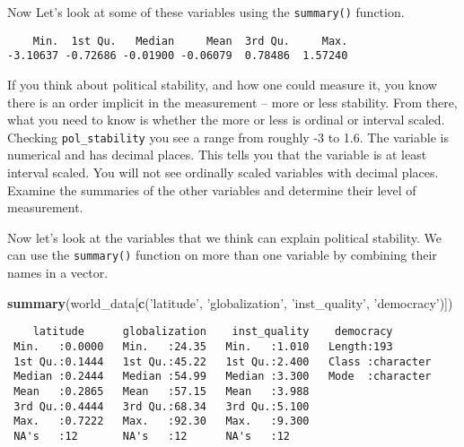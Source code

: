 \documentclass[]{article}
\newenvironment{Shaded}{\begin{snugshade}}{\end{snugshade}}
\newcommand{\KeywordTok}[1]{\textcolor[rgb]{0.13,0.29,0.53}{\textbf{#1}}}
\newcommand{\NormalTok}[1]{#1}
\newcommand{\OperatorTok}[1]{\textcolor[rgb]{0.81,0.36,0.00}{\textbf{#1}}}
\newcommand{\StringTok}[1]{\textcolor[rgb]{0.31,0.60,0.02}{#1}}
\begin{document}
Now Let's look at some of these variables using the \texttt{summary()} function.

\begin{Shaded}
\end{Shaded}

\begin{verbatim}
    Min.  1st Qu.   Median     Mean  3rd Qu.     Max. 
-3.10637 -0.72686 -0.01900 -0.06079  0.78486  1.57240 
\end{verbatim}

If you think about political stability, and how one could measure it, you know there is an order implicit in the measurement -- more or less stability. From there, what you need to know is whether the more or less is ordinal or interval scaled. Checking \texttt{pol\_stability} you see a range from roughly -3 to 1.6. The variable is numerical and has decimal places. This tells you that the variable is at least interval scaled. You will not see ordinally scaled variables with decimal places. Examine the summaries of the other variables and determine their level of measurement.

Now let's look at the variables that we think can explain political stability. We can use the \texttt{summary()} function on more than one variable by combining their names in a vector.

\begin{Shaded}
\begin{Highlighting}[]
\KeywordTok{summary}\NormalTok{(world_data[}\KeywordTok{c}\NormalTok{(}\StringTok{'latitude'}\NormalTok{, }\StringTok{'globalization'}\NormalTok{, }\StringTok{'inst_quality'}\NormalTok{, }\StringTok{'democracy'}\NormalTok{)])}
\end{Highlighting}
\end{Shaded}

\begin{verbatim}
    latitude      globalization    inst_quality    democracy        
 Min.   :0.0000   Min.   :24.35   Min.   :1.010   Length:193        
 1st Qu.:0.1444   1st Qu.:45.22   1st Qu.:2.400   Class :character  
 Median :0.2444   Median :54.99   Median :3.300   Mode  :character  
 Mean   :0.2865   Mean   :57.15   Mean   :3.988                     
 3rd Qu.:0.4444   3rd Qu.:68.34   3rd Qu.:5.100                     
 Max.   :0.7222   Max.   :92.30   Max.   :9.300                     
 NA's   :12       NA's   :12      NA's   :12                        
\end{verbatim}
\end{document}

